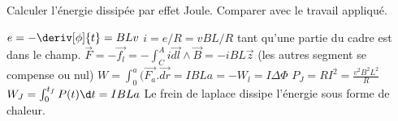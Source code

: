 \begin{Exercise}[title=Chute d'un cadre dans un champ magnétique]
\Question Calculer l’énergie dissipée par effet Joule. Comparer avec le travail appliqué.
\end{Exercise}
\begin{Answer}
  \Question $e = - \deriv[\phi]{t} = BLv$
  \Question $ i= e/R = vBL/R$ tant qu'une partie du cadre est dans le champ.
  \Question $ \vec{F}=-\vec{f_{l}} = -\int_{C}^{A}i\vec{dl}\wedge\vec{B} = -iBL\vec{z}$ (les autres segment se compense ou nul)
  \Question $W = \int_{0}^{a}(\vec{F_{a}}.\vec{dr}=IBLa=-W_{l}=I\Delta\Phi$
  \Question $P_{J}=RI^{2}=\frac{v^{2}B^{2}L^{2}}{R}$
  \Question $W_{J}=\int_{0}^{t_{f}}P(t)\d t= IBLa $
Le frein de laplace dissipe l'énergie sous forme de chaleur.
\end{Answer}
